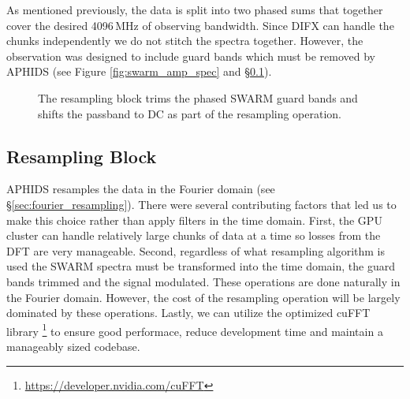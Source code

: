 As mentioned previously, the data is split into two phased sums that together cover the desired 4096\,MHz of 
observing bandwidth.  Since DIFX can handle the chunks independently we do not stitch the spectra together. 
However, the observation was designed to include guard bands which must be removed by APHIDS 
(see Figure \ref{fig:swarm_amp_spec} and \S\ref{sec:resamp_block}).

\begin{figure}[t!]
\linespread{1.}\selectfont{}
\centering
{}
\caption{The resampling block trims the phased SWARM guard bands and shifts the passband to DC as part of the 
resampling operation.}
\label{fig:resampling_block}
\end{figure}


\subsection{Resampling Block}\label{sec:resamp_block}

APHIDS resamples the data in the Fourier domain (see \S \ref{sec:fourier_resampling}).  There were several 
contributing factors that led us to make
this choice rather than apply filters in the time domain.  First, the GPU cluster can handle relatively large 
chunks of data at a time so losses from the DFT are very manageable.  Second, regardless of 
what resampling algorithm is used the SWARM spectra must 
be transformed into the time domain, the guard bands trimmed and the signal modulated.  These operations are done 
naturally in the Fourier domain.  However, the cost of the resampling operation will be largely dominated by 
these operations.  Lastly, we can utilize the optimized cuFFT library
\footnote{\url{https://developer.nvidia.com/cuFFT}} to ensure good performace, reduce development time and 
maintain a manageably sized codebase.

